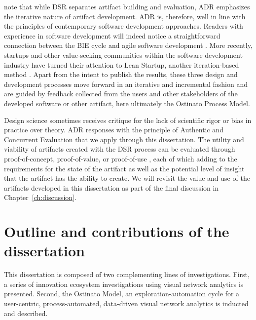 \cite{Sein2011ActionResearch} note that while DSR separates artifact building and evaluation, ADR emphasizes the iterative nature of artifact development. ADR is, therefore, well in line with the principles of contemporary software development approaches. Readers with experience in software development will indeed notice a straightforward connection between the BIE cycle and agile software development \citep[see e.g.][]{Schwaber2001}. More recently, startups and other value-seeking communities within the software development industry have turned their attention to Lean Startup, another iteration-based method \citep{Ries2011}. Apart from the intent to publish the results, these three design and development processes move forward in an iterative and incremental fashion and are guided by feedback collected from the users and other stakeholders of the developed software or other artifact, here ultimately the Ostinato Process Model.

Design science sometimes receives critique for the lack of scientific rigor or bias in practice over theory. ADR responses with the principle of Authentic and Concurrent Evaluation \citep{Sein2011ActionResearch} that we apply through this dissertation. 
The utility and viability of artifacts created with the DSR process can be evaluated through proof-of-concept, proof-of-value, or proof-of-use \citep{Nunamaker2011TowardSystems}, each of which adding to the requirements for the state of the artifact as well as the potential level of insight that the artifact has the ability to create. We will revisit the value and use of the artifacts developed in this dissertation as part of the final discussion in Chapter~\ref{ch:discussion}.  

\section{Outline and contributions of the dissertation}
\label{sec:structure}

This dissertation is composed of two complementing lines of investigations. First, a series of innovation ecosystem investigations using visual network analytics is presented. Second, the Ostinato Model, an exploration-automation cycle for a user-centric, process-automated, data-driven visual network analytics is inducted and described.

